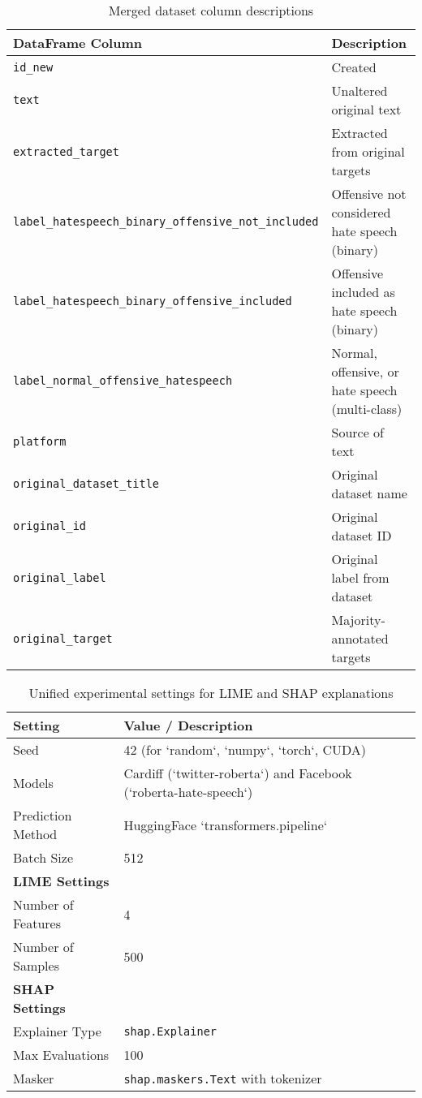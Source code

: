 \documentclass{article}
\begin{document}
\begin{table}[ht]
\centering
\begin{tabular}{ll}
\toprule
\textbf{DataFrame Column} & \textbf{Description} \\
\midrule
\texttt{id\_new} & Created \\
\texttt{text} & Unaltered original text \\
\texttt{extracted\_target} & Extracted from original targets \\
\texttt{label\_hatespeech\_binary\_offensive\_not\_included} & Offensive not considered hate speech (binary) \\
\texttt{label\_hatespeech\_binary\_offensive\_included} & Offensive included as hate speech (binary) \\
\texttt{label\_normal\_offensive\_hatespeech} & Normal, offensive, or hate speech (multi-class) \\
\texttt{platform} & Source of text \\
\texttt{original\_dataset\_title} & Original dataset name \\
\texttt{original\_id} & Original dataset ID \\
\texttt{original\_label} & Original label from dataset \\
\texttt{original\_target} & Majority-annotated targets \\
\bottomrule
\end{tabular}
\caption{Merged dataset column descriptions}
\label{tab:merged_columns}
\end{table}

\begin{table}[ht]
\centering
\begin{tabular}{ll}
\toprule
\textbf{Setting} & \textbf{Value / Description} \\
\midrule
Seed & 42 (for `random`, `numpy`, `torch`, CUDA) \\
Models & Cardiff (`twitter-roberta`) and Facebook (`roberta-hate-speech`) \\
Prediction Method & HuggingFace `transformers.pipeline` \\
Batch Size & 512 \\
\midrule
\textbf{LIME Settings} & \\
\quad Number of Features & 4 \\
\quad Number of Samples & 500 \\
\midrule
\textbf{SHAP Settings} & \\
\quad Explainer Type & \texttt{shap.Explainer} \\
\quad Max Evaluations & 100 \\
\quad Masker & \texttt{shap.maskers.Text} with tokenizer \\
\bottomrule
\end{tabular}
\caption{Unified experimental settings for LIME and SHAP explanations}
\label{tab:unified_settings}
\end{table}
\end{document}
